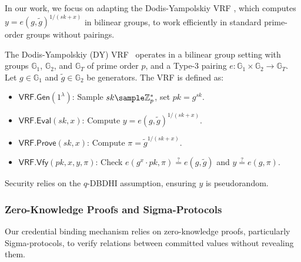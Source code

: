     
In our work, we focus on adapting the Dodis-Yampolskiy VRF \cite{hutchison_verifiable_2005}, which computes $y = e(g, \tilde{g})^{1/(sk+x)}$ in bilinear groups, to work efficiently in standard prime-order groups without pairings.

\begin{definition}
    The Dodis-Yampolskiy (DY) VRF~\cite{hutchison_verifiable_2005} operates in a bilinear group setting with groups $\mathbb{G}_1$, $\mathbb{G}_2$, and $\mathbb{G}_T$ of prime order $p$, and a Type-3 pairing $e: \mathbb{G}_1 \times \mathbb{G}_2 \to \mathbb{G}_T$. Let $g \in \mathbb{G}_1$ and $\tilde{g} \in \mathbb{G}_2$ be generators. The VRF is defined as:

\begin{itemize}
    \item $\mathsf{VRF.Gen}(1^\lambda)$: Sample $sk \sample \mathbb{Z}_p^*$, set $pk = g^{sk}$.
    \item $\mathsf{VRF.Eval}(sk, x)$: Compute $y = e(g, \tilde{g})^{1/(sk + x)}$.
    \item $\mathsf{VRF.Prove}(sk, x)$: Compute $\pi = \tilde{g}^{1/(sk + x)}$.
    \item $\mathsf{VRF.Vfy}(pk, x, y, \pi)$: Check $e(g^{x} \cdot pk, \pi) \stackrel{?}{=} e(g, \tilde{g})$ and $y \stackrel{?}{=} e(g, \pi)$.
\end{itemize}

Security relies on the $q$-DBDHI assumption, ensuring $y$ is pseudorandom.

\end{definition}



\subsubsection{Zero-Knowledge Proofs and Sigma-Protocols}
Our credential binding mechanism relies on zero-knowledge proofs, particularly Sigma-protocols, to verify relations between committed values without revealing them.

